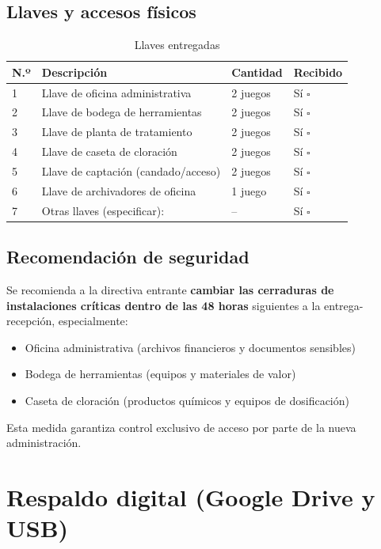 \subsection*{Llaves y accesos físicos}

\begin{table}[H]
\centering
\caption{Llaves entregadas}
\label{tab:llaves-entregadas}
\begin{tabularx}{\textwidth}{@{}lXll@{}}
\toprule
\textbf{N.º} & \textbf{Descripción} & \textbf{Cantidad} & \textbf{Recibido} \\
\midrule
1 & Llave de oficina administrativa & 2 juegos & Sí $\square$ \\
2 & Llave de bodega de herramientas & 2 juegos & Sí $\square$ \\
3 & Llave de planta de tratamiento & 2 juegos & Sí $\square$ \\
4 & Llave de caseta de cloración & 2 juegos & Sí $\square$ \\
5 & Llave de captación (candado/acceso) & 2 juegos & Sí $\square$ \\
6 & Llave de archivadores de oficina & 1 juego & Sí $\square$ \\
7 & Otras llaves (especificar): & -- & Sí $\square$ \\
\bottomrule
\end{tabularx}
\end{table}

\subsection*{Recomendación de seguridad}

Se recomienda a la directiva entrante \textbf{cambiar las cerraduras de instalaciones críticas dentro de las 48 horas} siguientes a la entrega-recepción, especialmente:

\begin{itemize}
  \item Oficina administrativa (archivos financieros y documentos sensibles)
  \item Bodega de herramientas (equipos y materiales de valor)
  \item Caseta de cloración (productos químicos y equipos de dosificación)
\end{itemize}

Esta medida garantiza control exclusivo de acceso por parte de la nueva administración.

\section{Respaldo digital (Google Drive y USB)}

